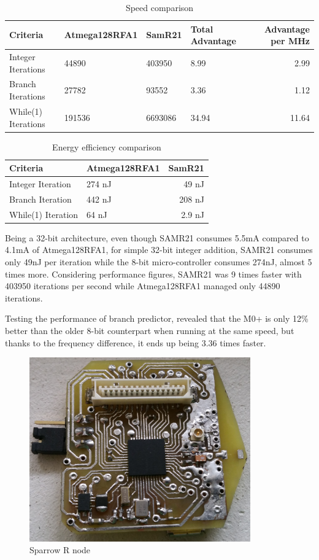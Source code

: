 \begin{table} \centering
\begin{tabular}{llllr}
\hline
Criteria    & Atmega128RFA1 & SamR21 & Total Advantage & Advantage per MHz \\
\hline
Integer Iterations      & 44890    & 403950   & 8.99 &  2.99 \\
Branch Iterations      & 27782    & 93552  &  3.36 &  1.12  \\
While(1) Iterations          & 191536     & 6693086    & 34.94  & 11.64  \\
\hline
\hline
\end{tabular}
\caption{Speed comparison}
\end{table}

\begin{table} \centering
\begin{tabular}{llr}
\hline
Criteria    & Atmega128RFA1 & SamR21 \\
\hline
Integer Iteration    &  274 nJ & 49 nJ \\
Branch Iteration      & 442 nJ & 208 nJ  \\
While(1) Iteration          & 64 nJ & 2.9 nJ \\
\hline
\hline
\end{tabular}
\caption{Energy efficiency comparison}
\end{table}

Being a 32-bit architecture, even though SAMR21 consumes 5.5mA
compared to 4.1mA of Atmega128RFA1, for simple 32-bit integer addition, SAMR21 consumes only 49nJ
per iteration while the 8-bit micro-controller consumes 274nJ, almost 5 times more. Considering
performance figures, SAMR21 was 9 times faster with 403950 iterations per second while
Atmega128RFA1 managed only 44890 iterations.

Testing the performance of branch predictor, revealed that the M0+ is only 12\% better than
the older 8-bit counterpart when running at the same speed, but thanks to the frequency difference,
it ends up being 3.36 times faster.


\begin{figure}[ht] \centering
\includegraphics[width=0.85\textwidth]{img/sparrowrf.jpg}
\caption{Sparrow R node}
\end{figure}


